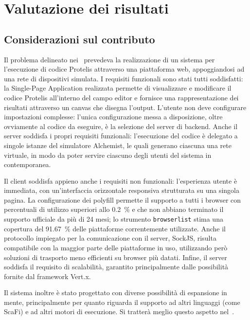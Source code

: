 \chapter{Valutazione dei risultati}\label{ch:evaluation}

  \section{Considerazioni sul contributo}
    Il problema delineato nei~ prevedeva la realizzazione di un sistema per l'esecuzione di codice Protelis attraverso una piattaforma web, appoggiandosi ad una rete di dispositivi simulata.
    I requisiti funzionali sono stati tutti soddisfatti:
    la Single-Page Application realizzata permette di visualizzare e modificare il codice Protelis all'interno del campo editor e fornisce una rappresentazione dei risultati attraverso un canvas che disegna l'output.
    L'utente non deve configurare impostazioni complesse:
    l'unica configurazione messa a disposizione, oltre ovviamente al codice da eseguire, è la selezione del server di backend.
    Anche il server soddisfa i propri requisiti funzionali:
    l'esecuzione del codice è delegato a singole istanze del simulatore Alchemist, le quali generano ciascuna una rete virtuale, in modo da poter servire ciascuno degli utenti del sistema in contemporanea.

    Il client soddisfa appieno anche i requisiti non funzionali:
    l'esperienza utente è immediata, con un'interfaccia orizzontale responsiva strutturata su una singola pagina.
    La configurazione dei polyfill permette il supporto a tutti i browser con percentuali di utilizzo superiori allo \SI{0.2}{\percent} e che non abbiano terminato il supporto ufficiale da più di 24 mesi;
    lo strumento \texttt{browserlist} stima una copertura del \SI{91.67}{\percent} delle piattaforme correntemente utilizzate.
    Anche il protocollo impiegato per la comunicazione con il server, SockJS, risulta compatibile con la maggior parte delle piattaforme in uso, utilizzando però soluzioni di trasporto meno efficienti su browser più datati.
    Infine, il server soddisfa il requisito di scalabilità, garantito principalmente dalle possibilità fornite dal framework Vert.x.

    Il sistema inoltre è stato progettato con diverse possibilità di espansione in mente, principalmente per quanto riguarda il supporto ad altri linguaggi (come ScaFi) e ad altri motori di esecuzione.
    Si tratterà meglio questo aspetto nel~.

